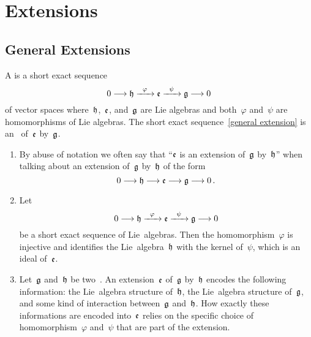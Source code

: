 \chapter{Extensions}








\section{General Extensions}

\begin{definition}
	A  is a short exact sequence
	\begin{equation}
		\label{general extension}
		0 
		\to
		\hlie
		\xto{\varphi}
		\elie
		\xto{\psi}
		\glie
		\to
		0
	\end{equation}
	of vector spaces where~$\mathfrak{h}$,~$\mathfrak{e}$, and~$\mathfrak{g}$ are Lie algebras and both~$\varphi$ and~$\psi$ are homomorphisms of Lie algebras.
	The short exact sequence~\eqref{general extension} is an~ of~$\mathfrak{e}$ by~$\mathfrak{g}$.
\end{definition}


\begin{remark}
	\leavevmode
	\begin{enumerate}
		\item
			By abuse of notation we often say that \enquote{$\mathfrak{e}$ is an extension of~$\mathfrak{g}$ by~$\mathfrak{h}$} when talking about an extension
			of~$\mathfrak{g}$ by~$\mathfrak{h}$ of the form
			\[
				0 
				\to
				\hlie
				\to
				\elie
				\to
				\glie
				\to
				0 \,.
			\]
		\item
			Let
			\[
				0
				\to
				\hlie
				\xto{\varphi}
				\elie
				\xto{\psi}
				\glie
				\to
				0
			\]
			be a short exact sequence of Lie~algebras.
			Then the homomorphism~$\varphi$ is injective and identifies the Lie~algebra~$\mathfrak{h}$ with the kernel of~$\psi$, which is an ideal of~$\mathfrak{e}$.
		\item
			Let~$\mathfrak{g}$ and~$\mathfrak{h}$ be two~\liealgebra{$\kf$}.
			An extension~$\mathfrak{e}$ of~$\mathfrak{g}$ by~$\mathfrak{h}$ encodes the following information:
			the Lie~algebra structure of~$\mathfrak{h}$, the Lie~algebra structure of~$\mathfrak{g}$, and some kind of interaction between~$\mathfrak{g}$ and~$\mathfrak{h}$.
			How exactly these informations are encoded into~$\mathfrak{e}$ relies on the specific choice of homomorphism~$\varphi$ and~$\psi$ that are part of the extension.
	\end{enumerate}
\end{remark}


